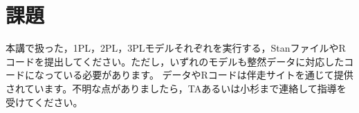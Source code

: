 \documentclass{ltjsbook}
\begin{document}
\section{課題}
本講で扱った，1PL，2PL，3PLモデルそれぞれを実行する，StanファイルやRコードを提出してください。ただし，いずれのモデルも整然データに対応したコードになっている必要があります。
データやRコードは伴走サイトを通じて提供されています。不明な点がありましたら，TAあるいは小杉まで連絡して指導を受けてください。
\end{document}
